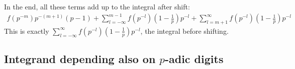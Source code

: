 \documentclass[12pt]{article}
\begin{document}
In the end, all these terms add up to the integral after shift:
\begin{equation}
\begin{aligned}
f(p^{-m})p^{-(m+1)}(p-1)+\sum\limits_{l=-\infty}^{m-1}f(p^{-l})(1-\frac{1}{p})p^{-l}+\sum\limits_{l=m+1}^{\infty}f(p^{-l})(1-\frac{1}{p}) p^{-l}
\end{aligned}
\end{equation}
This is exactly $\sum\limits_{l=-\infty}^{\infty}f(p^{-l})(1-\frac{1}{p})p^{-l}$, the integral before shifting.
\subsection{Integrand depending also on $p$-adic digits}
\end{document}
